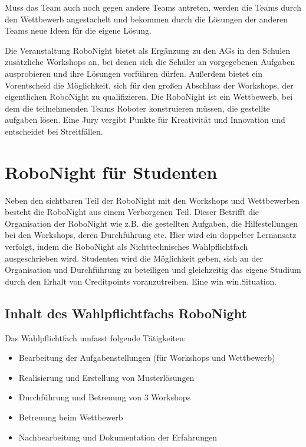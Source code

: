 Muss das Team auch noch gegen andere Teams antreten, werden die Teams durch den Wettbewerb angestachelt und bekommen durch die Lösungen der anderen Teams neue Ideen für die eigene Lösung.
  
Die Veranstaltung RoboNight bietet als Ergänzung zu den AGs in den Schulen zusätzliche Workshops an, bei denen sich die Schüler an vorgegebenen Aufgaben ausprobieren und ihre Lösungen vorführen dürfen. Außerdem bietet ein Vorentscheid die Möglichkeit, sich für den großen Abschluss der Workshops, der eigentlichen RoboNight zu qualifizieren. Die RoboNight ist ein Wettbewerb, bei dem die teilnehmenden Teams Roboter konstruieren müssen, die gestellte aufgaben lösen. Eine Jury vergibt Punkte für Kreativität und Innovation und entscheidet bei Streitfällen.

\section{RoboNight für Studenten}
Neben den sichtbaren Teil der RoboNight mit den Workshops und Wettbewerben besteht die RoboNight aus einem Verborgenen Teil. Dieser Betrifft die Organisation der RoboNight wie z.B. die gestellten Aufgaben, die Hilfestellungen bei den Workshops, deren Durchführung etc. Hier wird ein doppelter Lernansatz verfolgt, indem die RoboNight als Nichttechnisches Wahlpflichtfach ausgeschrieben wird. Studenten wird die Möglichkeit geben, sich an der Organisation und Durchführung zu beteiligen und gleichzeitig das eigene Studium durch den Erhalt von Creditpoints voranzutreiben. Eine win win.Situation.
  
\subsection{Inhalt des Wahlpflichtfachs RoboNight}
Das Wahlpflichtfach umfasst folgende Tätigkeiten:
 
\begin{itemize}
	\item Bearbeitung der Aufgabenstellungen (für Workshops und Wettbewerb)
	\item Realisierung und Erstellung von Musterlösungen
	\item Durchführung und Betreuung von 3 Workshops
	\item Betreuung beim Wettbewerb
	\item Nachbearbeitung und Dokumentation der Erfahrungen
\end{itemize}

